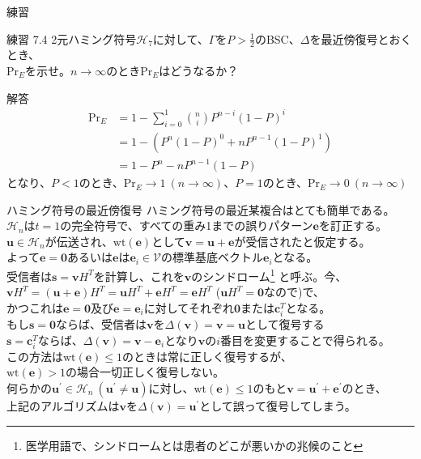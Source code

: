 \documentclass[dvipdfmx,10pt,jsarticle]{beamer}
\newcommand{\code}[1]{\mathcal{#1}}
\newcommand{\vs}[1]{\mathcal{#1}}
\renewcommand{\vec}[1]{\mathbf{#1}}
\begin{document}
  \begin{frame}{練習}
    \begin{block}{練習 7.4}
      2元ハミング符号$\code{H}_7$に対して、$\Gamma$を$P > \frac 12$のBSC、$\Delta$を最近傍復号とおくとき、 \\
      $\text{Pr}_E$を示せ。$n \rightarrow \infty$のとき$\text{Pr}_E$はどうなるか？
    \end{block}
    \begin{block}{解答}
      \begin{align*}
        \text{Pr}_E &= 1 - \sum_{i=0}^{1} \binom ni P^{n-i} {(1-P)}^i  \\
        &= 1 - (P^{n} {(1-P)}^0 + n P^{n-1} {(1-P)}^1) \\
        &= 1 - P^n - nP^{n-1}(1 - P)
      \end{align*}
      となり、$P < 1$のとき、$\text{Pr}_E \rightarrow 1 \ (n \rightarrow \infty)$、$P = 1$のとき、$\text{Pr}_E \rightarrow 0 \ (n \rightarrow \infty) $
    \end{block}
  \end{frame}
  \begin{frame}{ハミング符号の最近傍復号}
    ハミング符号の最近某複合はとても簡単である。 \\
    \vspace{1em}
    $\code{H}_n$は$t=1$の完全符号で、すべての重み1までの誤りパターン$\vec{e}$を訂正する。\\
    $\vec{u} \in \code{H}_n$が伝送され、$\text{wt}(\vec{e})$として$\vec{v} = \vec{u} + \vec{e}$が受信されたと仮定する。 \\
    よって$\vec{e} =\vec{0}$あるいは$\vec{e}$は$\vec{e}_i \in \vs{V}$の標準基底ベクトル$\vec{e}_i$となる。 \\
    \vspace{1em}
    受信者は$\vec{s} = \vec{v} H^T$を計算し、これを$\vec{v}$のシンドローム\footnote{{\scriptsize 医学用語で、シンドロームとは患者のどこが悪いかの兆候のこと}}
    と呼ぶ。今、$\vec{v}H^T = (\vec{u} + \vec{e}) H^T = \vec{u}H^T + \vec{e}H^T = \vec{e}H^T$ ($\vec{u}H^T = \vec{0}$なので)で、\\
    かつこれは$\vec{e} = \vec{0}$及び$\vec{e} = \vec{e}_i$に対してそれぞれ$\vec{0}$または$\vec{c}^T_i$となる。\\
    \vspace{1em}
    もし$\vec{s} = \vec{0}$ならば、受信者は$\vec{v}$を$\Delta (\vec{v}) = \vec{v} = \vec{u}$として復号する \\
    $\vec{s}= \vec{c}^T_i$ならば、$\Delta(\vec{v}) = \vec{v} - \vec{e}_i$となり$\vec{v}$の$i$番目を変更することで得られる。 \\
    この方法は$\text{wt}(\vec{e}) \leq 1$のときは常に正しく復号するが、\\
    $\text{wt}(\vec{e}) >1$の場合一切正しく復号しない。\\
    何らかの$\vec{u}^\prime \in \code{H}_n \ (\vec{u}^\prime \neq \vec{u})$に対し、$\text{wt}(\vec{e}) \leq 1$のもと$\vec{v} = \vec{u}^\prime + \vec{e}^\prime$のとき、 \\
    上記のアルゴリズムは$\vec{v}$を$\Delta (\vec{v}) = \vec{u}^\prime$として誤って復号してしまう。

  \end{frame}
\end{document}
